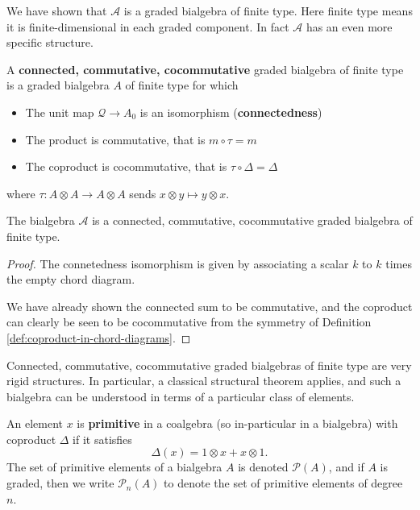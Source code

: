 We have shown that \(\mathcal{A}\) is a graded bialgebra of finite type. Here finite type means it is finite-dimensional in each graded component. In fact \(\mathcal{A}\) has an even more specific structure.

\begin{definition}
	A \textbf{connected, commutative, cocommutative} graded bialgebra of finite type is a graded bialgebra \(A\) of finite type for which
	\begin{itemize}
		\item The unit map \(\mathcal{Q} \to A_{0}\) is an isomorphism (\textbf{connectedness})
		\item The product is commutative, that is \(m \circ \tau = m\)
		\item The coproduct is cocommutative, that is \(\tau \circ \Delta = \Delta\)
	\end{itemize}
	where \(\tau : A \otimes A \to A \otimes A\) sends \(x \otimes y \mapsto y \otimes x\).
\end{definition}

\begin{proposition}
	The bialgebra \(\mathcal{A}\) is a connected, commutative, cocommutative graded bialgebra of finite type.
\end{proposition}

\begin{proof}
	The connetedness isomorphism is given by associating a scalar \(k\) to \(k\) times the empty chord diagram.

	We have already shown the connected sum to be commutative, and the coproduct can clearly be seen to be cocommutative from the symmetry of Definition \ref{def:coproduct-in-chord-diagrams}.
\end{proof}

Connected, commutative, cocommutative graded bialgebras of finite type are very rigid structures. In particular, a classical structural theorem applies, and such a bialgebra can be understood in terms of a particular class of elements.

\begin{definition}
	An element \(x\) is \textbf{primitive} in a coalgebra (so in-particular in a bialgebra) with coproduct \(\Delta\) if it satisfies
	\[\Delta(x) = 1 \otimes x + x \otimes 1.\]
	The set of primitive elements of a bialgebra \(A\) is denoted \(\mathcal{P}(A)\), and if \(A\) is graded, then we write \(\mathcal{P}_{n}(A)\) to denote the set of primitive elements of degree \(n\).
\end{definition}

